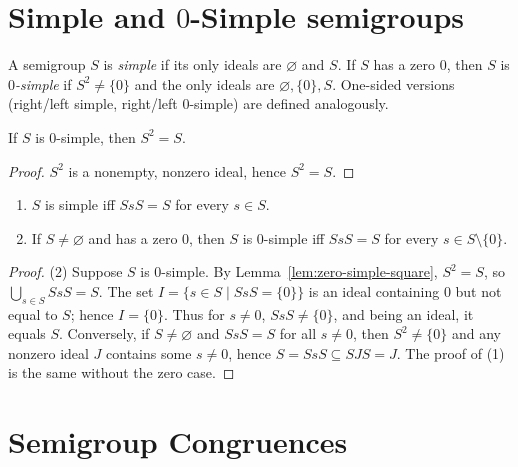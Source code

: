 \section {Simple and \(0\)-Simple semigroups}

\begin{definition}
\label{def:simple-zero-simple}
A semigroup \(S\) is \emph{simple} if its only ideals are \(\varnothing\) and \(S\). If \(S\) has a zero \(0\), then \(S\) is \emph{\(0\)-simple} if \(S^2\ne \{0\}\) and the only ideals are \(\varnothing,\{0\},S\). One-sided versions (right/left simple, right/left \(0\)-simple) are defined analogously.
\end{definition}

\begin{lemma}
\label{lem:zero-simple-square}
If \(S\) is \(0\)-simple, then \(S^2=S\).
\end{lemma}
\begin{proof}
\(S^2\) is a nonempty, nonzero ideal, hence \(S^2=S\).
\end{proof}

\begin{lemma}
\label{lem:simple-characterization}
\leavevmode
\begin{enumerate}
  \item \(S\) is simple iff \(S s S=S\) for every \(s\in S\).
  \item If \(S\ne\varnothing\) and has a zero \(0\), then \(S\) is \(0\)-simple iff \(S s S=S\) for every \(s\in S\setminus\{0\}\).
\end{enumerate}
\end{lemma}
\begin{proof}
(2) Suppose \(S\) is \(0\)-simple. By Lemma~\ref{lem:zero-simple-square}, \(S^2=S\), so \(\bigcup_{s\in S} SsS=S\). The set \(I=\{s\in S\mid SsS=\{0\}\}\) is an ideal containing \(0\) but not equal to \(S\); hence \(I=\{0\}\). Thus for \(s\ne 0\), \(SsS\ne \{0\}\), and being an ideal, it equals \(S\). Conversely, if \(S\ne\varnothing\) and \(SsS=S\) for all \(s\ne 0\), then \(S^2\ne \{0\}\) and any nonzero ideal \(J\) contains some \(s\ne 0\), hence \(S=SsS\subseteq SJS=J\). The proof of (1) is the same without the zero case.
\end{proof}

\section {Semigroup Congruences}

